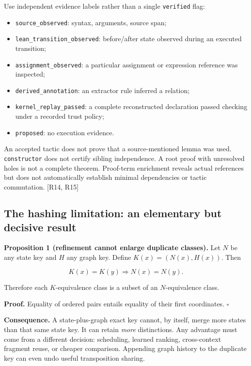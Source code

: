 \documentclass[
  10pt,
]{article}
\providecommand{\tightlist}{%
  \setlength{\itemsep}{0pt}\setlength{\parskip}{0pt}}
\begin{document}
Use independent evidence labels rather than a single \texttt{verified}
flag:

\begin{itemize}
\tightlist
\item
  \texttt{source\_observed}: syntax, arguments, source span;
\item
  \texttt{lean\_transition\_observed}: before/after state observed
  during an executed transition;
\item
  \texttt{assignment\_observed}: a particular assignment or expression
  reference was inspected;
\item
  \texttt{derived\_annotation}: an extractor rule inferred a relation;
\item
  \texttt{kernel\_replay\_passed}: a complete reconstructed declaration
  passed checking under a recorded trust policy;
\item
  \texttt{proposed}: no execution evidence.
\end{itemize}

An accepted tactic does not prove that a source-mentioned lemma was
used. \texttt{constructor} does not certify sibling independence. A root
proof with unresolved holes is not a complete theorem. Proof-term
enrichment reveals actual references but does not automatically
establish minimal dependencies or tactic commutation. {[}R14, R15{]}

\subsection{The hashing limitation: an elementary but decisive
result}\label{the-hashing-limitation-an-elementary-but-decisive-result}

\textbf{Proposition 1 (refinement cannot enlarge duplicate classes).}
Let \(N\) be any state key and \(H\) any graph key. Define
\(K(x)=(N(x),H(x))\). Then

\[K(x)=K(y)\Longrightarrow N(x)=N(y).\]

Therefore each \(K\)-equivalence class is a subset of an
\(N\)-equivalence class.

\textbf{Proof.} Equality of ordered pairs entails equality of their
first coordinates. \(\square\)

\textbf{Consequence.} A state-plus-graph exact key cannot, by itself,
merge more states than that same state key. It can retain \emph{more}
distinctions. Any advantage must come from a different decision:
scheduling, learned ranking, cross-context fragment reuse, or cheaper
comparison. Appending graph history to the duplicate key can even undo
useful transposition sharing.
\end{document}
